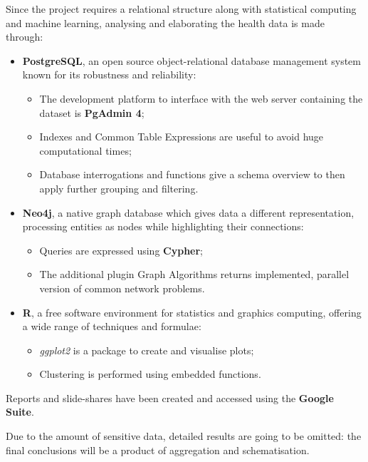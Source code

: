 Since the project requires a relational structure along with statistical computing and machine learning, analysing and elaborating the health data is made through:
\begin{itemize}
	\item \textbf{PostgreSQL}\cite{pg}, an open source object-relational database management system known for its robustness and reliability:
	\begin{itemize}
		\item The development platform to interface with the web server containing the dataset is \textbf{PgAdmin 4};
		\item Indexes and Common Table Expressions are useful to avoid huge computational times;
		\item Database interrogations and functions give a schema overview to then apply further grouping and filtering.
	\end{itemize}
	\item \textbf{Neo4j}\cite{neo}, a native graph database which gives data a different representation, processing entities as nodes while highlighting their connections:
	\begin{itemize}
		\item Queries are expressed using \textbf{Cypher};
		\item The additional plugin Graph Algorithms returns implemented, parallel version of common network problems. 
	\end{itemize}
	\item \textbf{R}\cite{r}, a free software environment for statistics and graphics computing, offering a wide range of techniques and formulae:
	\begin{itemize}
		\item \textit{ggplot2} is a package to create and visualise plots;
		\item Clustering is performed using embedded functions.
	\end{itemize}
\end{itemize}

Reports and slide-shares have been created and accessed using the \textbf{Google Suite}.

Due to the amount of sensitive data, detailed results are going to be omitted: the final conclusions will be a product of aggregation and schematisation.
